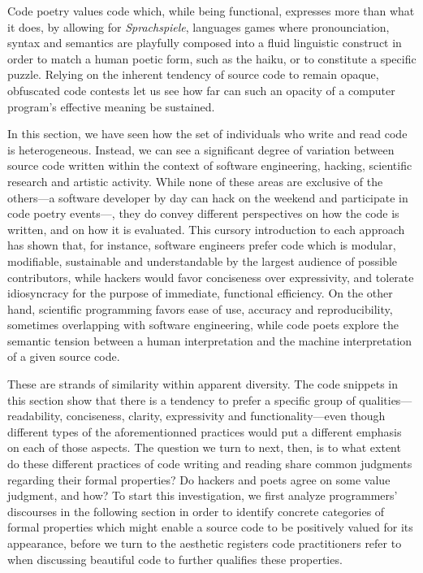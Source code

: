 Code poetry values code which, while being functional, expresses more than what it does, by allowing for \emph{Sprachspiele}, languages games where pronounciation, syntax and semantics are playfully composed into a fluid linguistic construct in order to match a human poetic form, such as the haiku, or to constitute a specific puzzle. Relying on the inherent tendency of source code to remain opaque, obfuscated code contests let us see how far can such an opacity of a computer program's effective meaning be sustained.

In this section, we have seen how the set of individuals who write and read code is heterogeneous. Instead, we can see a significant degree of variation between source code written within the context of software engineering, hacking, scientific research and artistic activity. While none of these areas are exclusive of the others—a software developer by day can hack on the weekend and participate in code poetry events—, they do convey different perspectives on how the code is written, and on how it is evaluated. This cursory introduction to each approach has shown that, for instance, software engineers prefer code which is modular, modifiable, sustainable and understandable by the largest audience of possible contributors, while hackers would favor conciseness over expressivity, and tolerate idiosyncracy for the purpose of immediate, functional efficiency. On the other hand, scientific programming favors ease of use, accuracy and reproducibility, sometimes overlapping with software engineering, while code poets explore the semantic tension between a human interpretation and the machine interpretation of a given source code.

These are strands of similarity within apparent diversity. The code snippets in this section show that there is a tendency to prefer a specific group of qualities—readability, conciseness, clarity, expressivity and functionality—even though different types of the aforementionned practices would put a different emphasis on each of those aspects. The question we turn to next, then, is to what extent do these different practices of code writing and reading share common judgments regarding their formal properties? Do hackers and poets agree on some value judgment, and how? To start this investigation, we first analyze programmers' discourses in the following section in order to identify concrete categories of formal properties which might enable a source code to be positively valued for its appearance, before we turn to the aesthetic registers code practitioners refer to when discussing beautiful code to further qualifies these properties.

